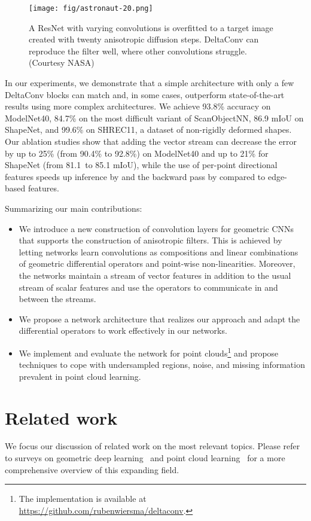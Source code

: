 \documentclass[acmtog, authorversion]{acmart}
\begin{document}
\begin{figure}
    \centering
    \texttt{[image: fig/astronaut-20.png]}
    \caption{A ResNet with varying convolutions is overfitted to a target image created with twenty anisotropic diffusion steps. DeltaConv can reproduce the filter well, where other convolutions struggle. (Courtesy NASA)}
    \label{fig:peronamalik}
\end{figure}

In our experiments, we demonstrate that a simple architecture with only a few DeltaConv blocks can match and, in some cases, outperform state-of-the-art results using more complex architectures. We achieve 93.8\% accuracy on ModelNet40, 84.7\% on the most difficult variant of ScanObjectNN, 86.9 mIoU on ShapeNet, and 99.6\% on SHREC11, a dataset of non-rigidly deformed shapes. Our ablation studies show that adding the vector stream can decrease the error by up to 25\% (from 90.4\% to 92.8\%) on ModelNet40 and up to 21\% for ShapeNet (from 81.1\ to 85.1 mIoU), while the use of per-point directional features speeds up inference by  and the backward pass by  compared to edge-based features.

Summarizing our main contributions:
\begin{itemize}
    \item We introduce a new construction of convolution layers for geometric CNNs that supports the construction of anisotropic filters.
    This is achieved by letting networks learn convolutions as compositions and linear combinations of geometric differential operators and point-wise non-linearities. Moreover, the networks maintain a stream of vector features in addition to the usual stream of scalar features and use the operators to communicate in and between the streams.
    \item We propose a network architecture that realizes our approach and adapt the differential operators to work effectively in our networks.
    \item We implement and evaluate the network for point clouds\footnote{The implementation is available at \url{https://github.com/rubenwiersma/deltaconv}.}
    and propose techniques to cope with undersampled regions, noise, and missing information prevalent in point cloud learning.
\end{itemize}
 \section{Related work}
We focus our discussion of related work on the most relevant topics. Please refer to surveys on geometric deep learning~\cite{Bronstein2017, bronstein2021geometric} and point cloud learning~\cite{guo2020survey, s19194188} for a more comprehensive overview of this expanding field.
\end{document}
